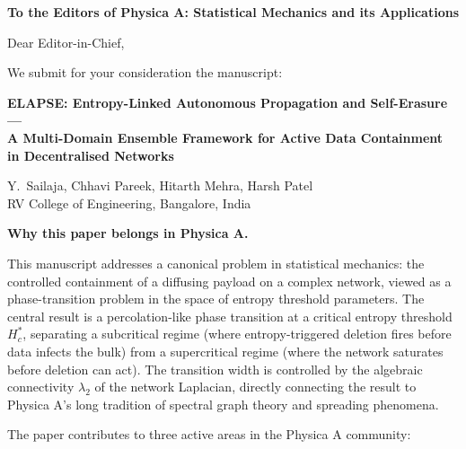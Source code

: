 \documentclass[12pt,a4paper]{article}
\begin{document}
\noindent
\textbf{To the Editors of Physica A: Statistical Mechanics and its Applications}

\medskip

\noindent
Dear Editor-in-Chief,

\medskip

We submit for your consideration the manuscript:

\begin{center}
  \textbf{ELAPSE: Entropy-Linked Autonomous Propagation and Self-Erasure ---\\
  A Multi-Domain Ensemble Framework for Active Data Containment\\
  in Decentralised Networks}

  \smallskip
  Y.\ Sailaja, Chhavi Pareek, Hitarth Mehra, Harsh Patel\\
  RV College of Engineering, Bangalore, India
\end{center}

\bigskip

\noindent\textbf{Why this paper belongs in Physica A.}

This manuscript addresses a canonical problem in statistical mechanics: the
controlled containment of a diffusing payload on a complex network, viewed
as a phase-transition problem in the space of entropy threshold parameters.
The central result is a percolation-like phase transition at a critical
entropy threshold $H_c^*$, separating a subcritical regime (where
entropy-triggered deletion fires before data infects the bulk) from a
supercritical regime (where the network saturates before deletion can act).
The transition width is controlled by the algebraic connectivity $\lambda_2$
of the network Laplacian, directly connecting the result to Physica A's
long tradition of spectral graph theory and spreading phenomena.

\medskip

The paper contributes to three active areas in the Physica A community:
\end{document}
